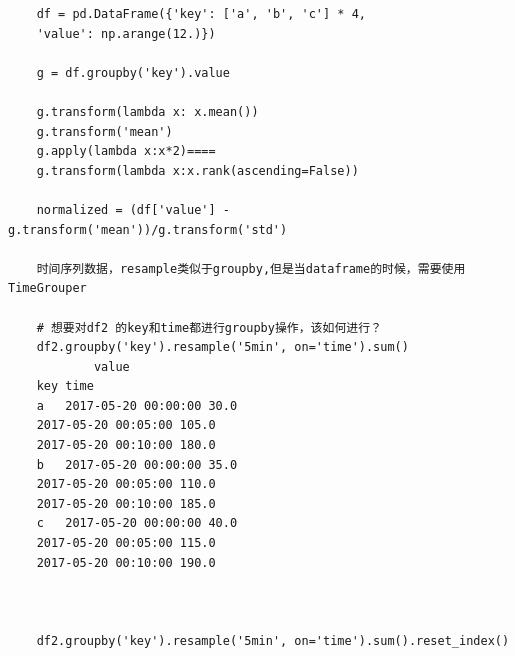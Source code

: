 \documentclass{article}
\begin{document}
\begin{lstlisting}
	df = pd.DataFrame({'key': ['a', 'b', 'c'] * 4,
	'value': np.arange(12.)})
	
	g = df.groupby('key').value
	
	g.transform(lambda x: x.mean())
	g.transform('mean')
	g.apply(lambda x:x*2)====
	g.transform(lambda x:x.rank(ascending=False))
	
	normalized = (df['value'] - g.transform('mean'))/g.transform('std')
	
	时间序列数据，resample类似于groupby,但是当dataframe的时候，需要使用TimeGrouper
	
	# 想要对df2 的key和time都进行groupby操作，该如何进行？
	df2.groupby('key').resample('5min', on='time').sum()
			value
	key	time	
	a	2017-05-20 00:00:00	30.0
	2017-05-20 00:05:00	105.0
	2017-05-20 00:10:00	180.0
	b	2017-05-20 00:00:00	35.0
	2017-05-20 00:05:00	110.0
	2017-05-20 00:10:00	185.0
	c	2017-05-20 00:00:00	40.0
	2017-05-20 00:05:00	115.0
	2017-05-20 00:10:00	190.0
	
	
	
	df2.groupby('key').resample('5min', on='time').sum().reset_index()
	
\end{lstlisting}
\end{document}
